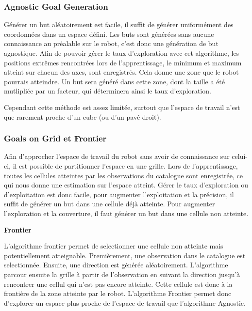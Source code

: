 \documentclass[11pt,french]{report}
\begin{document}
\subsubsection{Agnostic Goal Generation}

Générer un but aléatoirement est facile, il suffit de générer uniformément des coordonnées dans un espace défini.
Les buts sont générées sans aucune connaissance au préalable sur le robot, c'est donc une génération de but agnostique.
Afin de pouvoir gérer le taux d'exploration avec cet algorithme, les positions extrêmes rencontrées lors de l'apprentissage, le minimum et maximum atteint sur chacun des axes, sont enregistrés.
Cela donne une zone que le robot pourrais atteindre.
Un but sera généré dans cette zone, dont la taille a été mutlipliée par un facteur, qui déterminera ainsi le taux d'exploration.

Cependant cette méthode est assez limitée, surtout que l'espace de travail n'est que rarement proche d'un cube (ou d'un pavé droit).

\subsubsection{Goals on Grid et Frontier}

Afin d'approcher l'espace de travail du robot sans avoir de connaissance sur celui-ci, il est possible de partitionner l'espace en une grille.
Lors de l'apprentissage, toutes les cellules atteintes par les observations du catalogue sont enregistrée, ce qui nous donne une estimation sur l'espace atteint.
Gérer le taux d'exploration ou d'exploitation est donc facile, pour augmenter l'exploitation et la précision, il suffit de générer un but dans une cellule déjà atteinte.
Pour augmenter l'exploration et la couverture, il faut générer un but dans une cellule non atteinte.

\phantom{INVISIBLE LINE}

\textbf{Frontier}

\phantom{INVISIBLE LINE}

L'algorithme frontier permet de selectionner une cellule non atteinte mais potentiellement atteignable.
Premièrement, une observation dans le catalogue est selectionnée.
Ensuite, une direction est générée aléatoirement.
L'algorithme parcour ensuite la grille à partir de l'observation en suivant la direction jusqu'à rencontrer une cellul qui n'est pas encore atteinte.
Cette cellule est donc à la frontière de la zone atteinte par le robot.
L'algorithme Frontier permet donc d'explorer un espace plus proche de l'espace de travail que l'algorithme Agnostic.
\end{document}
